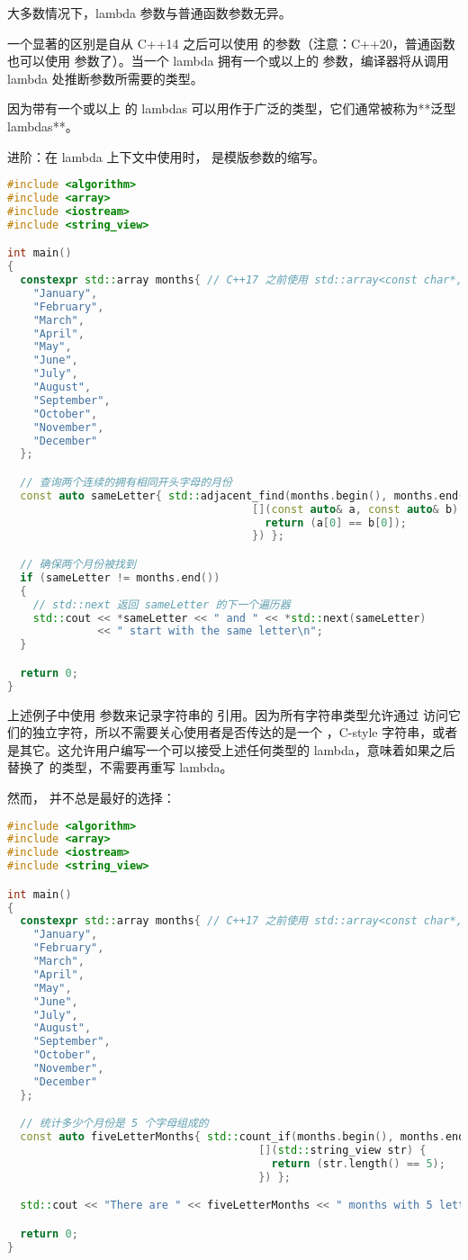 \documentclass[../../LearnCpp.tex]{subfiles}
\begin{document}
大多数情况下，lambda 参数与普通函数参数无异。

一个显著的区别是自从 C++14 之后可以使用  的参数（注意：C++20，普通函数也可以使用  参数了）。当一个 lambda 拥有一个或以上的  参数，编译器将从调用 lambda 处推断参数所需要的类型。

因为带有一个或以上  的 lambdas 可以用作于广泛的类型，它们通常被称为**泛型 lambdas**。

进阶：在 lambda 上下文中使用时， 是模版参数的缩写。

\begin{lstlisting}[language=C++]
#include <algorithm>
#include <array>
#include <iostream>
#include <string_view>

int main()
{
  constexpr std::array months{ // C++17 之前使用 std::array<const char*, 12>
    "January",
    "February",
    "March",
    "April",
    "May",
    "June",
    "July",
    "August",
    "September",
    "October",
    "November",
    "December"
  };

  // 查询两个连续的拥有相同开头字母的月份
  const auto sameLetter{ std::adjacent_find(months.begin(), months.end(),
                                      [](const auto& a, const auto& b) {
                                        return (a[0] == b[0]);
                                      }) };

  // 确保两个月份被找到
  if (sameLetter != months.end())
  {
    // std::next 返回 sameLetter 的下一个遍历器
    std::cout << *sameLetter << " and " << *std::next(sameLetter)
              << " start with the same letter\n";
  }

  return 0;
}
\end{lstlisting}

上述例子中使用  参数来记录字符串的  引用。因为所有字符串类型允许通过  访问它们的独立字符，所以不需要关心使用者是否传达的是一个 ，C-style 字符串，或者是其它。这允许用户编写一个可以接受上述任何类型的 lambda，意味着如果之后替换了  的类型，不需要再重写 lambda。

然而， 并不总是最好的选择：

\begin{lstlisting}[language=C++]
#include <algorithm>
#include <array>
#include <iostream>
#include <string_view>

int main()
{
  constexpr std::array months{ // C++17 之前使用 std::array<const char*, 12>
    "January",
    "February",
    "March",
    "April",
    "May",
    "June",
    "July",
    "August",
    "September",
    "October",
    "November",
    "December"
  };

  // 统计多少个月份是 5 个字母组成的
  const auto fiveLetterMonths{ std::count_if(months.begin(), months.end(),
                                       [](std::string_view str) {
                                         return (str.length() == 5);
                                       }) };

  std::cout << "There are " << fiveLetterMonths << " months with 5 letters\n";

  return 0;
}
\end{lstlisting}
\end{document}
